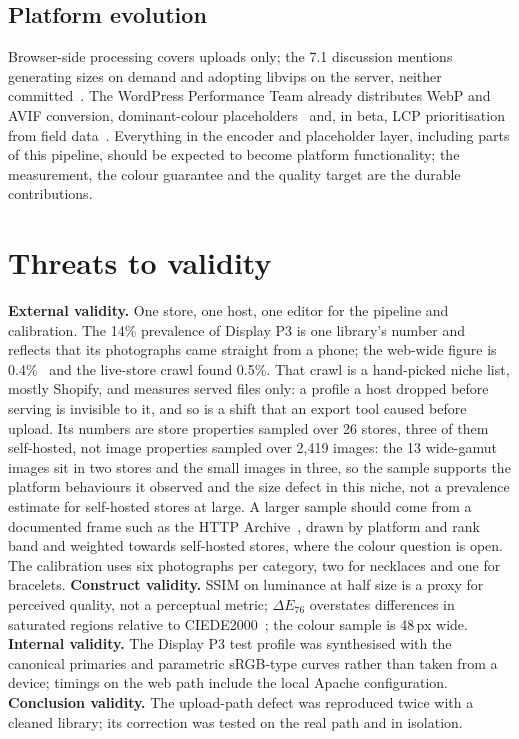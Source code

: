 \documentclass[sigconf,nonacm,screen]{acmart}
\begin{document}
\subsection{Platform evolution}

Browser-side processing covers uploads only; the 7.1 discussion mentions generating sizes on demand and adopting libvips on the server, neither committed~\cite{wp71devnote}. The WordPress Performance Team already distributes WebP and AVIF conversion, dominant-colour placeholders~\cite{dominantcolor} and, in beta, LCP prioritisation from field data~\cite{imageprioritizer}. Everything in the encoder and placeholder layer, including parts of this pipeline, should be expected to become platform functionality; the measurement, the colour guarantee and the quality target are the durable contributions.

\section{Threats to validity}

\textbf{External validity.} One store, one host, one editor for the pipeline and calibration. The 14\% prevalence of Display P3 is one library's number and reflects that its photographs came straight from a phone; the web-wide figure is 0.4\%~\cite{almanac2024media} and the live-store crawl found 0.5\%. That crawl is a hand-picked niche list, mostly Shopify, and measures served files only: a profile a host dropped before serving is invisible to it, and so is a shift that an export tool caused before upload. Its numbers are store properties sampled over 26 stores, three of them self-hosted, not image properties sampled over 2,419 images: the 13 wide-gamut images sit in two stores and the small images in three, so the sample supports the platform behaviours it observed and the size defect in this niche, not a prevalence estimate for self-hosted stores at large. A larger sample should come from a documented frame such as the HTTP Archive~\cite{httparchive}, drawn by platform and rank band and weighted towards self-hosted stores, where the colour question is open. The calibration uses six photographs per category, two for necklaces and one for bracelets. \textbf{Construct validity.} SSIM on luminance at half size is a proxy for perceived quality, not a perceptual metric; $\Delta E_{76}$ overstates differences in saturated regions relative to CIEDE2000~\cite{sharma2005ciede}; the colour sample is 48\,px wide. \textbf{Internal validity.} The Display P3 test profile was synthesised with the canonical primaries and parametric sRGB-type curves rather than taken from a device; timings on the web path include the local Apache configuration. \textbf{Conclusion validity.} The upload-path defect was reproduced twice with a cleaned library; its correction was tested on the real path and in isolation.
\end{document}
